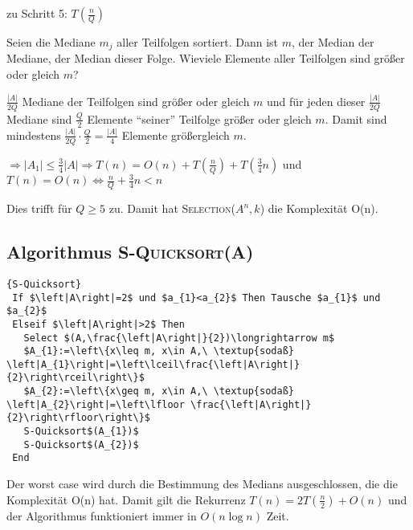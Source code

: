 \documentclass[ngerman,draft,parskip=half*,twoside]{scrreprt}
\theoremstyle{break}
\begin{document}
 zu Schritt 5: $T(\frac{n}{Q})$
 \bigskip
 
Seien die Mediane $m_{j}$ aller Teilfolgen sortiert. Dann ist $m$, der Median der Mediane, der Median dieser Folge. 
Wieviele Elemente aller Teilfolgen sind größer oder gleich $m$?

 $\frac{\left|A\right|}{2Q}$ Mediane der Teilfolgen sind größer oder gleich $m$ und für jeden dieser $\frac{\left|A\right|}{2Q}$
 Mediane sind $\frac{Q}{2}$ Elemente "`seiner"' Teilfolge größer oder gleich $m$. Damit sind mindestens
 $\frac{\left|A\right|}{2Q}\cdot \frac{Q}{2}=\frac{\left|A\right|}{4}$ Elemente größergleich $m$.
	
 $\Rightarrow\left|A_{1}\right|\leq\frac{3}{4}\left|A\right|\Rightarrow T(n)=O(n)+T(\frac{n}{Q})+T(\frac{3}{4}n)$
und $T(n)=O(n)\Longleftrightarrow\frac{n}{Q}+\frac{3}{4}n<n$

 Dies trifft für $Q\geq 5$ zu. Damit hat \textsc{Selection}($A^n,k$) die Komplexität O(n).

 \subsection{Algorithmus \textsc{S-Quicksort(A)}}

\begin{Algorithmus}[ht]
\begin{lstlisting}[frame=tlrb, mathescape=true, title=\textsc{S-Quicksort}, gobble=1]{S-Quicksort}
 If $\left|A\right|=2$ und $a_{1}<a_{2}$ Then Tausche $a_{1}$ und $a_{2}$
 Elseif $\left|A\right|>2$ Then
   Select $(A,\frac{\left|A\right|}{2})\longrightarrow m$
   $A_{1}:=\left\{x\leq m, x\in A,\ \textup{sodaß} \left|A_{1}\right|=\left\lceil\frac{\left|A\right|}{2}\right\rceil\right\}$
   $A_{2}:=\left\{x\geq m, x\in A,\ \textup{sodaß} \left|A_{2}\right|=\left\lfloor \frac{\left|A\right|}{2}\right\rfloor\right\}$
   S-Quicksort$(A_{1})$
   S-Quicksort$(A_{2})$
 End
 \end{lstlisting}
  \end{Algorithmus}

Der worst case wird durch die Bestimmung des Medians ausgeschlossen, die die Komplexität O(n) hat. Damit gilt die Rekurrenz
$T(n)=2T(\frac{n}{2})+O(n)$ und der Algorithmus funktioniert immer in $O(n \log n)$ Zeit.
 
\end{document}

